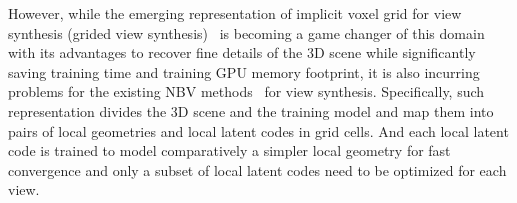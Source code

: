 However, while the emerging representation of implicit voxel grid for view synthesis (grided view synthesis)~\cite{sun_direct_2022,li_bnv-fusion_2022,zhu_nice-slam_2022} is becoming a game changer of this domain with its advantages to recover fine details of the 3D scene while significantly saving training time and training GPU memory footprint, it is also incurring problems for the existing NBV methods~\cite{shen_stochastic_2021,jin_neu-nbv_2023,ran_neurar_2023} for view synthesis.
Specifically, such representation divides the 3D scene and the training model and map them into pairs of local geometries and local latent codes in grid cells.
And each local latent code is trained to model comparatively a simpler local geometry for fast convergence and only a subset of local latent codes need to be optimized for each view.



